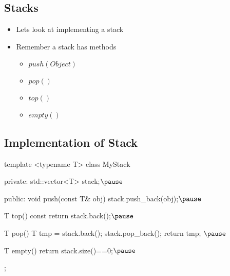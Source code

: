 \Outline


\begin{slide}
\section{Stacks}

\begin{PauseHighLight}
  \begin{itemize}
  \item Lets look at implementing a stack\pause
  \item Remember a stack has methods
    \begin{itemize}
    \item \jl$push(Object )$
    \item \jl$pop()$
    \item \jl$top()$
    \item \jl$empty()$\pause
    \end{itemize}
\end{itemize}
\end{PauseHighLight}
\end{slide}


\begin{slide}
\section[-1]{Implementation of Stack}

\begin{cpp}
template <typename T>
class MyStack
{
private:
  std::vector<T> stack;$\pause$

public:
  void push(const T& obj) {stack.push_back(obj);}$\pause$

  T top() const {return stack.back();}$\pause$

  T pop() {
    T tmp = stack.back();
    stack.pop_back();
    return tmp;
  }$\pause$

  T empty() {return stack.size()==0;}$\pause$
};
\end{cpp}
\end{slide}


